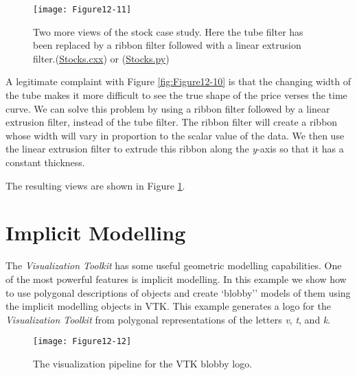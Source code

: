 \begin{figure}[!htb]
    \centering
    \texttt{[image: Figure12-11]}
    \caption{Two more views of the stock case study. Here the
        tube filter has been replaced by a ribbon filter followed with a
        linear extrusion filter.(\href{https://lorensen.github.io/VTKExamples/site/Cxx/VisualizationAlgorithms/Stocks/}{Stocks.cxx}) or (\href{https://lorensen.github.io/VTKExamples/site/Python/VisualizationAlgorithms/Stocks/}{Stocks.py})}
    \label{fig:Figure12-11}
\end{figure}

A legitimate complaint with Figure \ref{fig:Figure12-10} is that the changing
width of the tube makes it more difficult to see the true shape of the
price verses the time curve. We can solve this problem by using a
ribbon filter followed by a linear extrusion filter, instead of the
tube filter. The ribbon filter will create a ribbon whose width will
vary in proportion to the scalar value of the data. We then use the linear extrusion filter to extrude this ribbon along the \emph{y}-axis
so that it has a constant thickness.

The resulting views are shown in Figure \ref{fig:Figure12-11}.

\section{Implicit Modelling}

The \emph{Visualization Toolkit} has some useful geometric modelling capabilities. One of the most powerful features is implicit modelling. In this example we show how to use polygonal descriptions of objects and create `blobby'' models of them using the implicit modelling objects in VTK. This example generates a logo for the \emph{Visualization Toolkit} from polygonal representations of the letters \emph{v}, \emph{t}, and \emph{k}.

\begin{figure}[!htb]
    \centering
    \texttt{[image: Figure12-12]}
    \caption{The visualization pipeline for the VTK blobby logo.}
    \label{fig:Figure12-12}
\end{figure}

